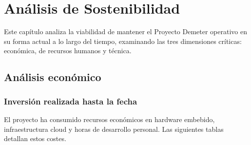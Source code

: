 \chapter{An\'alisis de Sostenibilidad}
\label{cap:sostenibilidad}

Este cap\'itulo analiza la viabilidad de mantener el Proyecto Demeter
operativo en su forma actual a lo largo del tiempo, examinando las tres
dimensiones cr\'iticas: econ\'omica, de recursos humanos y t\'ecnica.

\section{An\'alisis econ\'omico}
\label{sec:economico}

\subsection{Inversi\'on realizada hasta la fecha}

El proyecto ha consumido recursos econ\'omicos en hardware embebido,
infraestructura cloud y horas de desarrollo personal. Las siguientes
tablas detallan estos costes.


